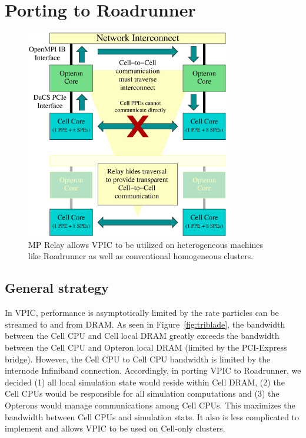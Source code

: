 \documentclass[journal,twoside]{IEEEtran}
\newcommand{\fig}[1]{Figure~\ref{fig:#1}}
\begin{document}
\section{Porting to Roadrunner}

\begin{figure}
\begin{center}
\includegraphics[width=3.5in]{figs/relay.eps}
\caption{MP Relay allows VPIC to be utilized on heterogeneous
machines like Roadrunner as well as conventional homogeneous
clusters.}
\label{fig:relay}
\end{center}
\end{figure}

\subsection{General strategy}

In VPIC, performance is asymptotically limited by the rate particles
can be streamed to and from DRAM.  As seen in \fig{triblade}, the
bandwidth between the Cell CPU and Cell local DRAM greatly exceeds the
bandwidth between the Cell CPU and Opteron local DRAM (limited by the
PCI-Express bridge).  However, the Cell CPU to Cell CPU bandwidth is
limited by the internode Infiniband connection.  Accordingly, in
porting VPIC to Roadrunner, we decided (1) all local simulation state
would reside within Cell DRAM, (2) the Cell CPUs would be responsible
for all simulation computations and (3) the Opterons would manage
communications among Cell CPUs.  This maximizes the bandwidth between
Cell CPUs and simulation state.  It also is less complicated to
implement and allows VPIC to be used on Cell-only clusters.
\end{document}

